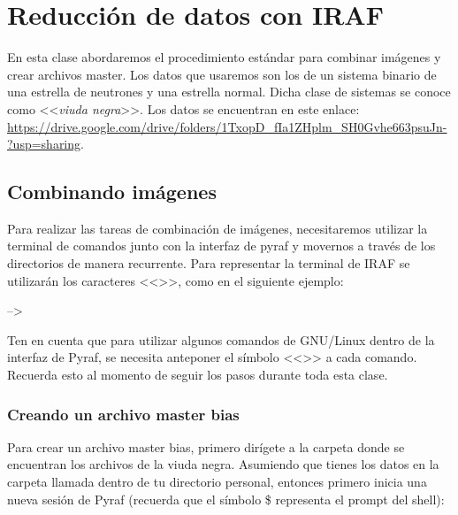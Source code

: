 \chapter{Reducción de datos con IRAF}
En esta clase abordaremos el procedimiento estándar para combinar imágenes y crear archivos master. Los datos que usaremos son los de un sistema binario de una estrella de neutrones y una estrella normal. Dicha clase de sistemas se conoce como <<\emph{viuda negra}>>. Los datos se encuentran en este enlace: \url{https://drive.google.com/drive/folders/1TxopD_fIa1ZHplm_SH0Gvhe663psuJn-?usp=sharing}.

\section{Combinando imágenes}
Para realizar las tareas de combinación de imágenes, necesitaremos utilizar la terminal de comandos junto con la interfaz de pyraf y movernos a través de los directorios de manera recurrente. Para representar la terminal de IRAF se utilizarán los caracteres <<\norbash{-->}>>, como en el siguiente ejemplo:

\begin{shell}
--> 
\end{shell}

Ten en cuenta que para utilizar algunos comandos de GNU/Linux dentro de la interfaz de Pyraf, se necesita anteponer el símbolo <<\norbash{!}>> a cada comando. Recuerda esto al momento de seguir los pasos durante toda esta clase. 

\subsection{Creando un archivo master bias}
Para crear un archivo master bias, primero dirígete a la carpeta donde se encuentran los archivos de la viuda negra. Asumiendo que tienes los datos en la carpeta llamada  dentro de tu directorio personal, entonces primero inicia una nueva sesión de Pyraf (recuerda que el símbolo \$ representa el prompt del shell):


